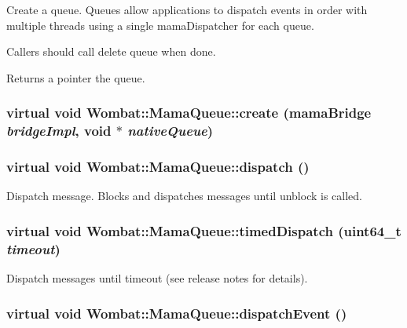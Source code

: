 Create a queue. Queues allow applications to dispatch events in order with multiple threads using a single mamaDispatcher for each queue.

Callers should call delete queue when done.

\begin{DoxyReturn}{Returns}
a pointer the queue. 
\end{DoxyReturn}
\hypertarget{classWombat_1_1MamaQueue_ab8a04086971890f7a9a7b0eadf4c2a53}{
\subsubsection[{create}]{\setlength{\rightskip}{0pt plus 5cm}virtual void Wombat::MamaQueue::create (mamaBridge {\em bridgeImpl}, \/  void $\ast$ {\em nativeQueue})}}
\label{classWombat_1_1MamaQueue_ab8a04086971890f7a9a7b0eadf4c2a53}
\hypertarget{classWombat_1_1MamaQueue_ad5c395fb2d9b7b97686a685be649f3d7}{
\subsubsection[{dispatch}]{\setlength{\rightskip}{0pt plus 5cm}virtual void Wombat::MamaQueue::dispatch ()}}
\label{classWombat_1_1MamaQueue_ad5c395fb2d9b7b97686a685be649f3d7}


Dispatch message. Blocks and dispatches messages until unblock is called. \hypertarget{classWombat_1_1MamaQueue_adcabd83819f9373cf9662529881b7ed8}{
\subsubsection[{timedDispatch}]{\setlength{\rightskip}{0pt plus 5cm}virtual void Wombat::MamaQueue::timedDispatch (uint64\_\-t {\em timeout})}}
\label{classWombat_1_1MamaQueue_adcabd83819f9373cf9662529881b7ed8}


Dispatch messages until timeout (see release notes for details). \hypertarget{classWombat_1_1MamaQueue_aa173a08f81436cb9da85adf4ce9e570a}{
\subsubsection[{dispatchEvent}]{\setlength{\rightskip}{0pt plus 5cm}virtual void Wombat::MamaQueue::dispatchEvent ()}}
\label{classWombat_1_1MamaQueue_aa173a08f81436cb9da85adf4ce9e570a}


